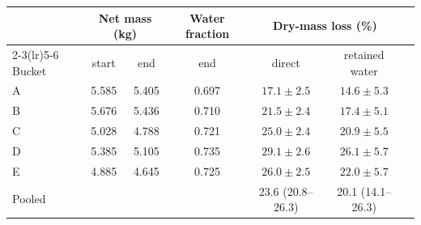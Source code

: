\begin{tabular}{lcccccc}
\toprule
 & \multicolumn{2}{c}{Net mass (kg)} & Water fraction & \multicolumn{2}{c}{Dry-mass loss (\%)}\\
\cmidrule(lr){2-3}\cmidrule(lr){5-6}
Bucket & start & end & end & direct & retained water\\
\midrule
A & 5.585 & 5.405 & 0.697 & $17.1\pm2.5$ & $14.6\pm5.3$\\
B & 5.676 & 5.436 & 0.710 & $21.5\pm2.4$ & $17.4\pm5.1$\\
C & 5.028 & 4.788 & 0.721 & $25.0\pm2.4$ & $20.9\pm5.5$\\
D & 5.385 & 5.105 & 0.735 & $29.1\pm2.6$ & $26.1\pm5.7$\\
E & 4.885 & 4.645 & 0.725 & $26.0\pm2.5$ & $22.0\pm5.7$\\
\midrule
Pooled & & & & 23.6 (20.8--26.3) & 20.1 (14.1--26.3)\\
\bottomrule
\end{tabular}
